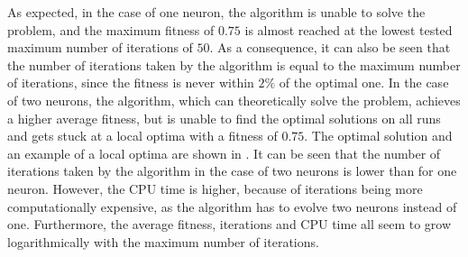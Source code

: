 As expected, in the case of one neuron, the algorithm is unable to solve the problem, and the maximum fitness of $0.75$ is almost reached at the lowest tested maximum number of iterations of $50$.
As a consequence, it can also be seen that the number of iterations taken by the algorithm is equal to the maximum number of iterations, since the fitness is never within $2\%$ of the optimal one.
In the case of two neurons, the algorithm, which can theoretically solve the problem, achieves a higher average fitness, but is unable to find the optimal solutions on all runs and gets stuck
at a local optima with a fitness of $0.75$. The optimal solution and an example of a local optima are shown in .
It can be seen that the number of iterations taken by the algorithm in the case of two neurons is lower than for one neuron. However, the CPU time is higher, because of iterations being more
computationally expensive, as the algorithm has to evolve two neurons instead of one.
Furthermore, the average fitness, iterations and CPU time all seem to grow logarithmically with the maximum number of iterations.

